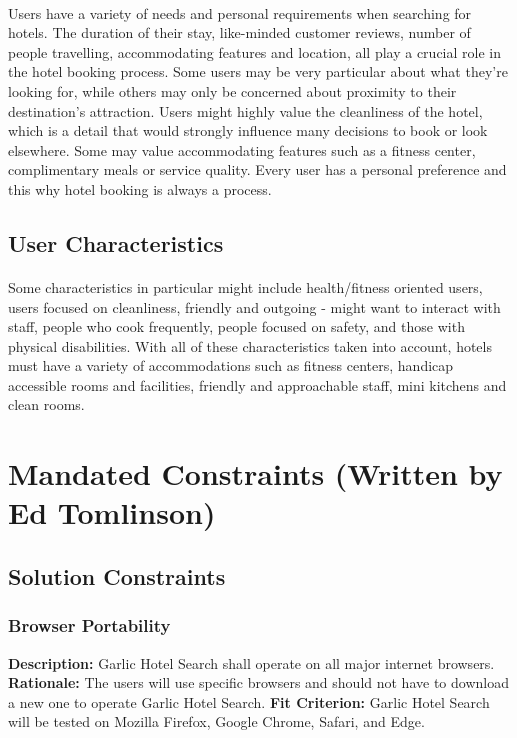 \documentclass[]{article}
\begin{document}
\paragraph{}
Users have a variety of needs and personal requirements when searching for hotels. The duration of their stay, like-minded customer reviews, number of people travelling, accommodating features and location, all play a crucial role in the hotel booking process. Some users may be very particular about what they’re looking for, while others may only be concerned about proximity to their destination’s attraction. Users might highly value the cleanliness of the hotel, which is a detail that would strongly influence many decisions to book or look elsewhere. Some may value accommodating features such as a fitness center, complimentary meals or service quality. Every user has a personal preference and this why hotel booking is always a process.
\subsection{User Characteristics}
\paragraph{}
Some characteristics in particular might include health/fitness oriented users, users focused on cleanliness, friendly and outgoing - might want to interact with staff, people who cook frequently, people focused on safety, and those with physical disabilities. With all of these characteristics taken into account, hotels must have a variety of accommodations such as fitness centers, handicap accessible rooms and facilities, friendly and approachable staff, mini kitchens and clean rooms.

\section{Mandated Constraints (Written by Ed Tomlinson)}
\subsection{Solution Constraints}

\subsubsection{Browser Portability}
\textbf{Description:} Garlic Hotel Search shall operate on all major internet browsers.\newline
\textbf{Rationale:} The users will use specific browsers and should not have to download a new one to operate Garlic Hotel Search.\newline
\textbf{Fit Criterion:} Garlic Hotel Search will be tested on Mozilla Firefox, Google Chrome, Safari, and Edge.
\end{document}
